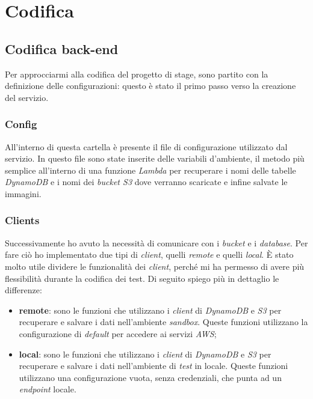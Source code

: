 \chapter{Codifica}
\label{cap:codifica}
\renewcommand{\lstlistingname}{Listato}


\section{Codifica back-end}

Per approcciarmi alla codifica del progetto di stage, sono partito con la
definizione delle configurazioni: questo è stato il primo passo verso la
creazione del servizio.

\subsection{Config}

All'interno di questa cartella è presente il file di configurazione utilizzato
dal servizio. In questo file sono state inserite delle variabili d'ambiente, il
metodo più semplice all'interno di una funzione \emph{Lambda} per recuperare i nomi delle tabelle \emph{DynamoDB}
e i nomi dei \emph{bucket S3} dove verranno scaricate e infine salvate le immagini.

\subsection{Clients}
Successivamente ho avuto la necessità di comunicare con i \emph{bucket} e i
\emph{database}. Per fare ciò ho implementato due tipi di \emph{client}, quelli
\emph{remote} e quelli \emph{local}. È stato molto utile dividere le
funzionalità dei \emph{client}, perché mi ha permesso di avere più flessibilità durante
la codifica dei test. Di seguito spiego più in dettaglio le differenze:
\begin{itemize}
      \item \textbf{remote}: sono le funzioni che utilizzano i \emph{client} di
            \emph{DynamoDB} e \emph{S3} per recuperare e salvare i dati nell'ambiente
            \emph{sandbox}. Queste funzioni utilizzano la configurazione di
            \emph{default} per accedere ai servizi \emph{AWS};
      \item \textbf{local}: sono le funzioni che utilizzano i \emph{client} di
            \emph{DynamoDB} e \emph{S3} per recuperare e salvare i dati nell'ambiente di
            \emph{test} in locale. Queste funzioni utilizzano una configurazione vuota,
            senza credenziali, che punta ad un \emph{endpoint} locale.
\end{itemize}

